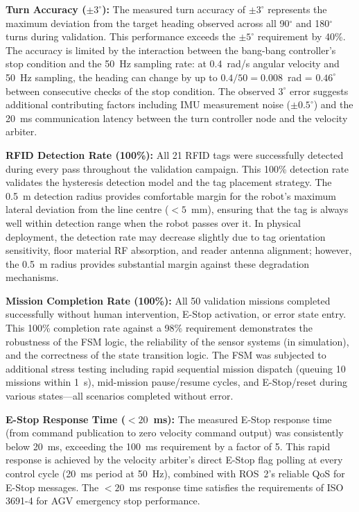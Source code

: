 \documentclass[12pt,a4paper,oneside]{report}
\begin{document}
\textbf{Turn Accuracy ($\pm 3^{\circ}$):} The measured turn accuracy of $\pm 3^{\circ}$ represents the maximum deviation from the target heading observed across all 90$^{\circ}$ and 180$^{\circ}$ turns during validation. This performance exceeds the $\pm 5^{\circ}$ requirement by 40\%. The accuracy is limited by the interaction between the bang-bang controller's stop condition and the 50~Hz sampling rate: at 0.4~rad/s angular velocity and 50~Hz sampling, the heading can change by up to $0.4/50 = 0.008$~rad = $0.46^{\circ}$ between consecutive checks of the stop condition. The observed $3^{\circ}$ error suggests additional contributing factors including IMU measurement noise ($\pm 0.5^{\circ}$) and the 20~ms communication latency between the turn controller node and the velocity arbiter.

\textbf{RFID Detection Rate (100\%):} All 21 RFID tags were successfully detected during every pass throughout the validation campaign. This 100\% detection rate validates the hysteresis detection model and the tag placement strategy. The 0.5~m detection radius provides comfortable margin for the robot's maximum lateral deviation from the line centre ($< 5$~mm), ensuring that the tag is always well within detection range when the robot passes over it. In physical deployment, the detection rate may decrease slightly due to tag orientation sensitivity, floor material RF absorption, and reader antenna alignment; however, the 0.5~m radius provides substantial margin against these degradation mechanisms.

\textbf{Mission Completion Rate (100\%):} All 50 validation missions completed successfully without human intervention, E-Stop activation, or error state entry. This 100\% completion rate against a 98\% requirement demonstrates the robustness of the FSM logic, the reliability of the sensor systems (in simulation), and the correctness of the state transition logic. The FSM was subjected to additional stress testing including rapid sequential mission dispatch (queuing 10 missions within 1~s), mid-mission pause/resume cycles, and E-Stop/reset during various states---all scenarios completed without error.

\textbf{E-Stop Response Time ($< 20$~ms):} The measured E-Stop response time (from command publication to zero velocity command output) was consistently below 20~ms, exceeding the 100~ms requirement by a factor of 5. This rapid response is achieved by the velocity arbiter's direct E-Stop flag polling at every control cycle (20~ms period at 50~Hz), combined with ROS~2's reliable QoS for E-Stop messages. The $< 20$~ms response time satisfies the requirements of ISO 3691-4 for AGV emergency stop performance.
\end{document}
